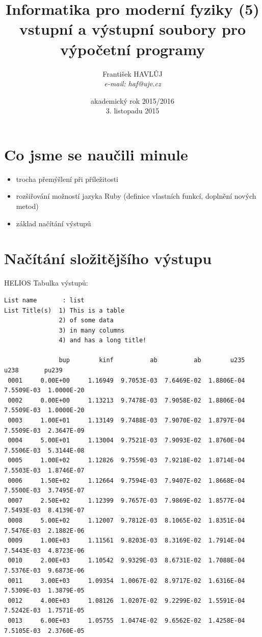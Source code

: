 \documentclass{beamer}
\title[IMF (5)]{Informatika pro moderní fyziky (5)\\vstupní a výstupní soubory pro výpočetní programy}
\author[Franti\v{s}ek HAVL\r{U}J, ORF ÚJV Řež]{Franti\v{s}ek HAVL\r{U}J\\{\scriptsize \emph{e-mail: haf@ujv.cz}}}
\date{akademický rok 2015/2016\\3. listopadu 2015}
\institute[ORF ÚJV Řež]
{ÚJV Řež\\oddělení Reaktorové fyziky a podpory palivového cyklu}
\begin{document}
\begin{frame}
  \titlepage
\end{frame}

\begin{frame}
  \tableofcontents
\end{frame}

\section{Co jsme se naučili minule}

\begin{frame}{}
  \begin{itemize}
    \item trocha přemýšlení při příležitosti 
    \item rozšiřování možností jazyka Ruby (definice vlastních funkcí, doplnění nových metod)
    \item základ načítání výstupů
  \end{itemize}
\end{frame}


\section{Načítání složitějšího výstupu}

\begin{frame}[fragile]{HELIOS}
  Tabulka výstupů:
  \scriptsize
  \begin{verbatim}
List name       : list
List Title(s)  1) This is a table
               2) of some data
               3) in many columns
               4) and has a long title!

               bup        kinf          ab          ab        u235        u238       pu239
 0001     0.00E+00     1.16949  9.7053E-03  7.6469E-02  1.8806E-04  7.5509E-03  1.0000E-20
 0002     0.00E+00     1.13213  9.7478E-03  7.9058E-02  1.8806E-04  7.5509E-03  1.0000E-20
 0003     1.00E+01     1.13149  9.7488E-03  7.9070E-02  1.8797E-04  7.5509E-03  2.3647E-09
 0004     5.00E+01     1.13004  9.7521E-03  7.9093E-02  1.8760E-04  7.5506E-03  5.3144E-08
 0005     1.00E+02     1.12826  9.7559E-03  7.9218E-02  1.8714E-04  7.5503E-03  1.8746E-07
 0006     1.50E+02     1.12664  9.7594E-03  7.9407E-02  1.8668E-04  7.5500E-03  3.7495E-07
 0007     2.50E+02     1.12399  9.7657E-03  7.9869E-02  1.8577E-04  7.5493E-03  8.4139E-07
 0008     5.00E+02     1.12007  9.7812E-03  8.1065E-02  1.8351E-04  7.5476E-03  2.1882E-06
 0009     1.00E+03     1.11561  9.8203E-03  8.3169E-02  1.7914E-04  7.5443E-03  4.8723E-06
 0010     2.00E+03     1.10542  9.9329E-03  8.6731E-02  1.7088E-04  7.5376E-03  9.6873E-06
 0011     3.00E+03     1.09354  1.0067E-02  8.9717E-02  1.6316E-04  7.5309E-03  1.3879E-05
 0012     4.00E+03     1.08126  1.0207E-02  9.2299E-02  1.5591E-04  7.5242E-03  1.7571E-05
 0013     6.00E+03     1.05755  1.0474E-02  9.6562E-02  1.4258E-04  7.5105E-03  2.3760E-05
  \end{verbatim}
\end{frame}
\end{document}
